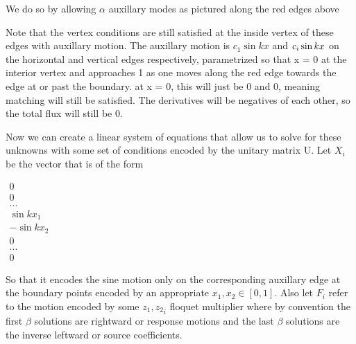 \documentclass[12pt]{article}
\begin{document}
\centerline{}

We do so by allowing $\alpha$ auxillary modes as pictured along the red edges above



Note that the vertex conditions are still satisfied at the inside vertex of these edges with auxillary motion. The auxillary motion is $c_1 \sin{kx}$ and $\-c_i \sin{kx}$ on the horizontal and vertical edges respectively, parametrized so that x = 0 at the interior vertex and approaches 1 as one moves along the red edge towards the edge at or past the boundary. at x = 0, this will just be 0 and 0, meaning matching will still be satisfied. The derivatives will be negatives of each other, so the total flux will still be 0. 


Now we can create a linear system of equations that allow us to solve for these unknowns with some set of conditions encoded by the unitary matrix U. Let $X_i$ be the vector that is of the form 

 $ \begin{array}{c}
      0 \\ 0 \\ ... \\ \sin{kx_1} \\ -\sin{kx_2} \\ 0 \\ ... \\0
  \end{array}$
   
So that it encodes the sine motion only on the corresponding auxillary edge at the boundary points encoded by an appropriate $x_1, x_2 \in [0, 1]$. Also let $F_i$ refer to the motion encoded by some ${z_1, z_2}_i$ floquet multiplier where by convention the first $\beta$ solutions are rightward or response motions and the last $\beta$ solutions are the inverse leftward or source coefficients.
\end{document}
